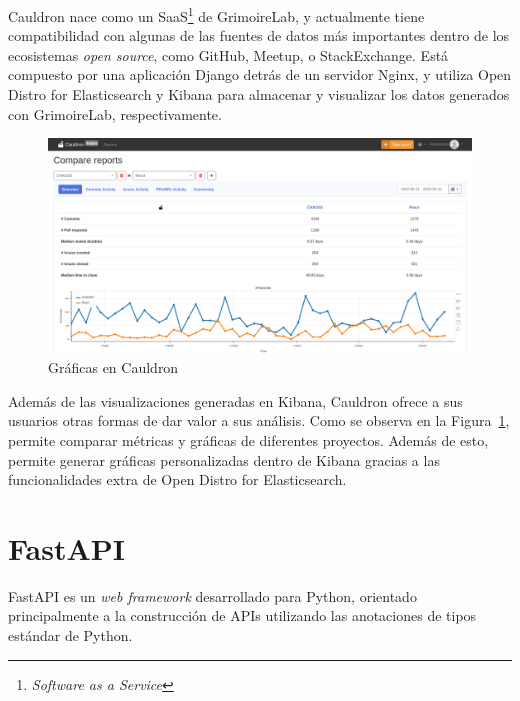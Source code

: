 Cauldron nace como un SaaS\footnote{\emph{Software as a Service}} de GrimoireLab, y actualmente tiene compatibilidad con algunas de las fuentes de datos más importantes dentro de los ecosistemas \emph{open source}, como GitHub, Meetup, o StackExchange. Está compuesto por una aplicación Django detrás de un servidor Nginx, y utiliza Open Distro for Elasticsearch y Kibana para almacenar y visualizar los datos generados con GrimoireLab, respectivamente.

\begin{figure}[ht]
    \centering
    \includegraphics[width=\textwidth]{Figures/cauldron-charts}
    \decoRule
    \caption[Cauldron (Gráficas)]{Gráficas en Cauldron \emph{\parencite{Reference13}}}
    \label{fig:cauldron-charts}
\end{figure}

Además de las visualizaciones generadas en Kibana, Cauldron ofrece a sus usuarios otras formas de dar valor a sus análisis. Como se observa en la Figura~\ref{fig:cauldron-charts}, permite comparar métricas y gráficas de diferentes proyectos. Además de esto, permite generar gráficas personalizadas dentro de Kibana gracias a las funcionalidades extra de Open Distro for Elasticsearch.


\section{FastAPI}

FastAPI es un \emph{web framework} desarrollado para Python, orientado principalmente a la construcción de APIs utilizando las anotaciones de tipos estándar de Python. \emph{\parencite{Reference14}}

